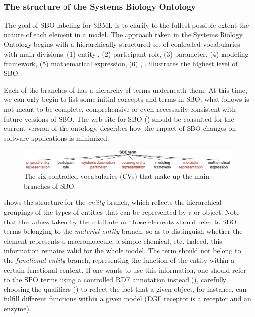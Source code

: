 \subsubsection{The structure of the Systems Biology Ontology}

The goal of SBO labeling for SBML is to clarify to the fullest
possible extent the nature of each element in a model.  The
approach taken in the Systems Biology Ontology begins with a
hierarchically-structured set of controlled vocabularies with 
main divisions: (1)  entity , (2) participant role, (3)  parameter, (4) modeling framework, (5)
mathematical expression, (6) , .   illustrates
the highest level of SBO.

Each of the  branches of  has a
hierarchy of terms underneath them.  At this time, we can only
begin to list some initial concepts and terms in SBO; what follows
is not meant to be complete, comprehensive or even necessarily
consistent with future versions of SBO.    The web site for SBO
(\sboref) should be consulted for the current version of the
ontology.   describes how
the impact of SBO changes on software applications is minimized.

\begin{figure}[tbh]
  \centering
  \includegraphics[scale = 0.8]{figs/sbo-top-level}
  \vspace*{1ex}
  \caption{The six controlled vocabularies (CVs) that
      make up the main branches of SBO.}
  \label{fig:sbo-top-level}
\end{figure}

 shows the structure for the
\emph{ entity } branch, which reflects the hierarchical groupings of
the types of entities that can be represented by a \Compartment or
\Species object.  Note that the values taken by the
 attribute on those elements should refer to SBO
terms belonging to the \emph{material entity} branch, so as to
distinguish whether the element represents a macromolecule, a
simple chemical, etc.  Indeed, this information remains valid for
the whole model. The term should not belong to the
\emph{functional entity} branch, representing the function of the
entity within a certain functional context. If one wants to use
this information, one should refer to the SBO terms using a
controlled RDF annotation instead
(), carefully choosing the
qualifiers () to reflect
the fact that a given \Species object, for instance, can fulfill
different functions within a given model (\eg EGF receptor is a
receptor and an enzyme).

